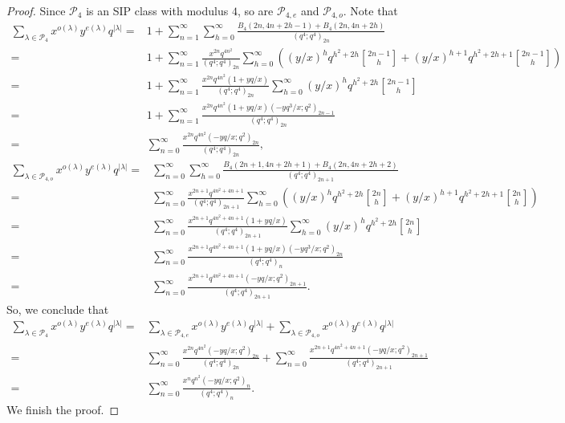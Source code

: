 \documentclass[12pt]{amsart}
\theoremstyle{definition}
\theoremstyle{remark}
\numberwithin{equation}{section}
\begin{document}
\begin{proof}
Since $\mathcal{P}_4$ is an SIP class with modulus $4$, so are $\mathcal{P}_{4,e}$ and $\mathcal{P}_{4,o}$. Note that
\begin{align*}\label{eq}
\sum_{\lambda\in\mathcal{P}_4}x^{o(\lambda)}y^{e(\lambda)}q^{|\lambda|}=&1+\sum_{n=1}^{\infty}\sum_{h=0}^{\infty}\frac{B_4(2n,4n+2h-1)+B_4(2n,4n+2h)}{(q^4;q^4)_{2n}}\\
=&1+\sum_{n=1}^{\infty}\frac{x^{2n}q^{4n^2}}{(q^4;q^4)_{2n}}\sum_{h=0}^{\infty}\left((y/x)^{h}q^{h^2+2h}{2n-1\brack h}+(y/x)^{h+1}q^{h^2+2h+1}{2n-1\brack h}\right)\\
=&1+\sum_{n=1}^{\infty}\frac{x^{2n}q^{4n^2}(1+yq/x)}{(q^4;q^4)_{2n}}\sum_{h=0}^{\infty}(y/x)^hq^{h^2+2h}{2n-1\brack h}\\
=&1+\sum_{n=1}^{\infty}\frac{x^{2n}q^{4n^2}(1+yq/x)(-yq^3/x;q^2)_{2n-1}}{(q^4;q^4)_{2n}}\\
=&\sum_{n=0}^{\infty}\frac{x^{2n}q^{4n^2}(-yq/x;q^2)_{2n}}{(q^4;q^4)_{2n}},
\end{align*}
\begin{align*}
\sum_{\lambda\in\mathcal{P}_{4,o}}x^{o(\lambda)}y^{e(\lambda)}q^{|\lambda|}=&\sum_{n=0}^{\infty}\sum_{h=0}^{\infty}\frac{B_4(2n+1,4n+2h+1)+B_4(2n,4n+2h+2)}{(q^4;q^4)_{2n+1}}\\
=&\sum_{n=0}^{\infty}\frac{x^{2n+1}q^{4n^2+4n+1}}{(q^4;q^4)_{2n+1}}\sum_{h=0}^{\infty}\left((y/x)^{h}q^{h^2+2h}{2n\brack h}+(y/x)^{h+1}q^{h^2+2h+1}{2n\brack h}\right)\\
=&\sum_{n=0}^{\infty}\frac{x^{2n+1}q^{4n^2+4n+1}(1+yq/x)}{(q^4;q^4)_{2n+1}}\sum_{h=0}^{\infty}(y/x)^hq^{h^2+2h}{2n\brack h}\\
=&\sum_{n=0}^{\infty}\frac{x^{2n+1}q^{4n^2+4n+1}(1+yq/x)(-yq^3/x;q^2)_{2n}}{(q^4;q^4)_{n}}\\
=&\sum_{n=0}^{\infty}\frac{x^{2n+1}q^{4n^2+4n+1}(-yq/x;q^2)_{2n+1}}{(q^4;q^4)_{2n+1}}.
\end{align*}
So, we conclude that
\begin{align*}
\sum_{\lambda\in\mathcal{P}_4}x^{o(\lambda)}y^{e(\lambda)}q^{|\lambda|}=&\sum_{\lambda\in\mathcal{P}_{4,e}}x^{o(\lambda)}y^{e(\lambda)}q^{|\lambda|}+\sum_{\lambda\in\mathcal{P}_{4,o}}x^{o(\lambda)}y^{e(\lambda)}q^{|\lambda|}\\
=&\sum_{n=0}^{\infty}\frac{x^{2n}q^{4n^2}(-yq/x;q^2)_{2n}}{(q^4;q^4)_{2n}}+\sum_{n=0}^{\infty}\frac{x^{2n+1}q^{4n^2+4n+1}(-yq/x;q^2)_{2n+1}}{(q^4;q^4)_{2n+1}}\\
=&\sum_{n=0}^{\infty}\frac{x^nq^{n^2}(-yq/x;q^2)_{n}}{(q^4;q^4)_{n}}.
\end{align*}
We finish the proof. 
\end{proof}
\end{document}
